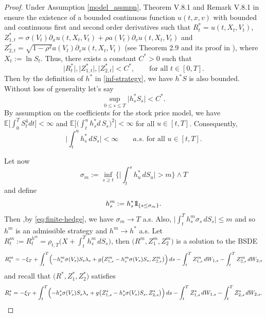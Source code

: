 \documentclass{article}
\def\p{\partial}
\newcommand{\E}{\mathbb{E}}
\def\ind{{\mathchoice{1\mskip-4mu\mathrm l}{1\mskip-4mu\mathrm l}
		{1\mskip-4.5mu\mathrm l}{1\mskip-5mu\mathrm l}}}
\begin{document}
\begin{proof}
Under Assumption \ref{model_assmpn}, Theorem V.8.1 and Remark V.8.1 in \cite{Lad68} ensure the existence of a bounded continuous function $u(t,x,v)$ with bounded and continuous  first and second order derivatives  such that $R_t^*= u(t, X_t, V_t)$, $Z^*_{1, t}=\sigma(V_t)\p_x u(t, X_t, V_t)+\rho a(V_t)\p_v u(t,X_t, V_t) $ and $Z^*_{2,t}=\sqrt{1-\rho^2}a(V_t)\p_vu(t, X_t, V_t)$ (see Theorem 2.9 and its proof in \cite{SS15}), where $X_t:=\ln S_t$.  Thus, there exists a constant $C^*>0$ such that 
\begin{equation}\label{bound_Z^*}
	\bigl\vert R_t^*\bigr\vert, \bigl\vert Z^*_{1,t}\bigr\vert, \bigl\vert Z^*_{2,t}\bigr\vert <C^*, \qquad \text{for all }t\in [0,T].
\end{equation}
Then by the definition of $h^*$ in \eqref{inf-strategy}, we have $h^*S$ is also bounded. Without loss of generality let's say
\begin{equation}\label{eq:h*bound}
	\sup_{0\leq s\leq T}\bigl\vert h^*_sS_s \bigr\vert < C^*.
\end{equation}
By assumption on the coefficients for the stock price model, we have $\E\bigl[\int_0^T S_t^4 dt\bigr]<\infty$ and  $\E\bigl[\bigl(\int_t^uh_s^*d \, S_s\bigr)^2\bigr]<\infty$ for all $u\in [t,T]$. Consequently,
\begin{equation}\label{eq:finite-hedge}
	\biggl\vert \int_t^uh_s^* \, dS_s \biggr\vert <\infty \qquad  a.s. \text{ for all }u\in [t,T].
\end{equation}

Let now
\[
	\sigma_m:= \inf_{s\geq t}\biggl\{\biggl\vert \int_t^s h^*_u \, dS_{u}\biggr\vert >m\biggr\}\wedge T
\]
and define
\[
	h^m_s:= h^*_s \ind_{\{s\leq \sigma_m\}}.
\]
Then ,by \eqref{eq:finite-hedge}, we have  $\sigma_m\to T$ a.s. Also, $\bigl\vert \int_t^Th^m_s \sigma_s \, dS_s \bigr\vert \leq m$ and so $h^m$ is an admissible strategy and $h^m\to h^*$ a.s. Let $R^m_t:=R^{h^m}_t= \rho_{t,T}\bigl(X+\int_t^T h^m_s \, dS_s\bigr)$, then $\bigl(R^m, Z^m_1, Z^m_2\bigr)$ is a solution to the BSDE
 \[
	 R_t^m = -\xi_T +\int_t^T\Bigl(-h^m_s\sigma(V_s)S_s\lambda_s+ g\bigl(Z_{1,s}^m-h^m_s\sigma(V_s)S_s, Z_{2,s}^m\bigr)\Bigr) \, ds -\int_t^T Z^m_{1,s} \, dW_{1,s} -\int_t^T Z^m_{2,s}\, dW_{2,s}
 \]
 and recall that $\bigl(R^*, Z_1^*, Z_2^*\bigr)$ satisfies
 \[
 	R_t^*= -\xi_T +\int_t^T\Bigl(-h^*_s\sigma(V_s)S_s\lambda_s+ g\bigl(Z_{1,s}^*-h^*_s\sigma(V_s)S_s, Z_{2,s}^*\bigr)\Bigr) \, ds -\int_t^T Z^*_{1,s} \, dW_{1,s} -\int_t^T Z^*_{2,s} \, dW_{2,s}.
 \]


\end{proof}
\end{document}
